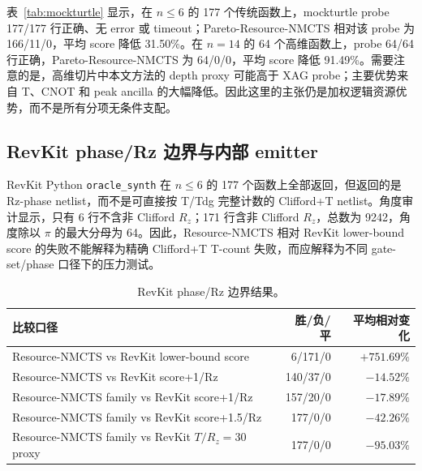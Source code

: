 \documentclass[UTF8,fontset=macnew,11pt]{ctexart}
\newcommand{\method}{Resource-NMCTS}
\newcommand{\rz}{\ensuremath{R_z}}
\begin{document}
\begin{table}[H]
\centering
\scriptsize
\caption{官方 mockturtle KLUT-to-XAG probe 对比。资源为 XAG AND/XOR/depth 派生的逻辑层 proxy，不是官方 ROS、可逆 garbage management 或硬件 mapping。}
\label{tab:mockturtle}


\vspace{0.8em}

\end{table}

表~\ref{tab:mockturtle} 显示，在 $n\leq6$ 的 177 个传统函数上，mockturtle probe 177/177 行正确、无 error 或 timeout；Pareto-\method{} 相对该 probe 为 166/11/0，平均 score 降低 31.50\%。在 $n=14$ 的 64 个高维函数上，probe 64/64 行正确，Pareto-\method{} 为 64/0/0，平均 score 降低 91.49\%。需要注意的是，高维切片中本文方法的 depth proxy 可能高于 XAG probe；主要优势来自 T、CNOT 和 peak ancilla 的大幅降低。因此这里的主张仍是加权逻辑资源优势，而不是所有分项无条件支配。

\subsection{RevKit phase/Rz 边界与内部 emitter}

RevKit Python \texttt{oracle\_synth} 在 $n\leq6$ 的 177 个函数上全部返回，但返回的是 Rz-phase netlist，而不是可直接按 T/Tdg 完整计数的 Clifford+T netlist。角度审计显示，只有 6 行不含非 Clifford \rz{}；171 行含非 Clifford \rz{}，总数为 9242，角度除以 $\pi$ 的最大分母为 64。因此，\method{} 相对 RevKit lower-bound score 的失败不能解释为精确 Clifford+T T-count 失败，而应解释为不同 gate-set/phase 口径下的压力测试。

\begin{table}[H]
\centering
\small
\caption{RevKit phase/Rz 边界结果。}
\label{tab:rz-boundary}
\begin{tabularx}{\linewidth}{>{\raggedright\arraybackslash}Xrr}
\toprule
比较口径 & 胜/负/平 & 平均相对变化 \\
\midrule
\method{} vs RevKit lower-bound score & 6/171/0 & $+751.69\%$ \\
\method{} vs RevKit score+1/Rz & 140/37/0 & $-14.52\%$ \\
Resource-NMCTS family vs RevKit score+1/Rz & 157/20/0 & $-17.89\%$ \\
Resource-NMCTS family vs RevKit score+1.5/Rz & 177/0/0 & $-42.26\%$ \\
Resource-NMCTS family vs RevKit $T/R_z=30$ proxy & 177/0/0 & $-95.03\%$ \\
\bottomrule
\end{tabularx}
\end{table}
\end{document}
